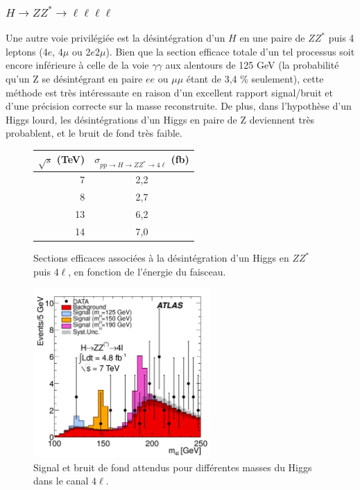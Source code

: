 \documentclass[11pt]{article} %
\begin{document}
\subsubsection{$H \to ZZ^* \to \ell \ell \ell \ell$}

Une autre voie privilégiée est la désintégration d'un $H$ en une paire de $ZZ^*$ puis 4 leptons (4$e$, 4$\mu$ ou 2$e$2$\mu$). Bien que la section efficace totale d'un tel processus soit encore inférieure à celle de la voie $\gamma \gamma$ aux alentours de 125 GeV  (la probabilité qu'un Z se désintégrant en paire $ee$ ou $\mu \mu$ étant de 3,4 \% seulement), cette méthode est très intéressante en raison d'un excellent rapport signal/bruit et d'une précision correcte sur la masse reconstruite. De plus, dans l'hypothèse d'un Higgs lourd, les désintégrations d'un Higgs en paire de Z deviennent très probablent, et le bruit de fond très faible.

\begin{figure}[H]
\centering
\begin{tabular}{|r|c|} 
   \hline
   $\sqrt{s}$ (TeV) & $\sigma_{pp \to H \to ZZ^* \to 4\ell}$ (fb) \\
    \hline
   7 &  2,2\\
\hline
   8 & 2,7 \\
\hline
   13 & 6,2  \\
\hline
   14 & 7,0 \\
  \hline
\end{tabular}
\caption{Sections efficaces associées à la désintégration d'un Higgs en $ZZ^*$ puis 4$\ell$, en fonction de l'énergie du faisceau.}
\end{figure}

\begin{figure}[H]
\centering
  \caption{Signal et bruit de fond attendus pour différentes masses du Higgs dans le canal $4\ell$. \cite{atlas_zz_llll}}
 \includegraphics[width=0.6\textwidth]{../images/atlas_llll_events.png}
\end{figure}
\end{document}
